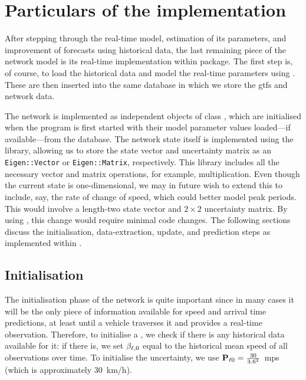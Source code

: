\section{Particulars of the \rt{} implementation}
\label{sec:nw_implementation}

After stepping through the real-time model, estimation of its parameters, and improvement of forecasts using historical data, the last remaining piece of the network model is its real-time implementation within  package. The first step is, of course, to load the historical data and model the real-time parameters using . These are then inserted into the same database in which we store the \gls{gtfs} and network data.


The network is implemented as independent objects of class , which are initialised when the program is first started with their model parameter values loaded---if available---from the database. The network state itself is implemented using the  \Cpp{} library, allowing us to store the state vector and uncertainty matrix as an \verb+Eigen::Vector+ or \verb+Eigen::Matrix+, respectively. This library includes all the necessary vector and matrix operations, for example, multiplication. Even though the current state is one-dimensional, we may in future wish to extend this to include, say, the rate of change of speed, which could better model peak periods. This would involve a length-two state vector and $2\times2$ uncertainty matrix. By using , this change would require minimal code changes. The following sections discuss the initialisation, data-extraction, update, and prediction steps as implemented within .


\subsection{Initialisation}
\label{sec:nw_implementation_init}

The initialisation phase of the network is quite important since in many cases it will be the only piece of information available for speed and arrival time predictions, at least until a vehicle traverses it and provides a real-time observation. Therefore, to initialise a , we check if there is any historical data available for it: if there is, we set $\beta_{\ell,0}$ equal to the historical mean speed of all observations over time. To initialise the uncertainty, we use $\mathbf{P}_{\ell 0} = \frac{30}{3.6^2}$~\gls{mps} (which is approximately 30~km/h).

